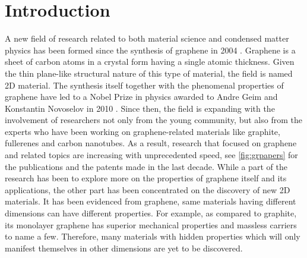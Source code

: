 
\chapter{Introduction \label{chap:1}}  %

\ifpdf
    \graphicspath{{Chapter1/Figs/Raster/}{Chapter1/Figs/PDF/}{Chapter1/Figs/}{Chapter1/Figs/Vector/}}
\else
    \graphicspath{{Chapter1/Figs/Vector/}{Chapter1/Figs/}}
\fi

A new field of research related to both material science and condensed matter physics has been formed since the synthesis of graphene in 2004 \cite{Novoselov666,Novoselov26072005}. Graphene is a sheet of carbon atoms in a crystal form having a single atomic thickness. Given the thin plane-like structural nature of this type of material, the field is named 2D material. The synthesis itself together with the phenomenal properties of graphene have led to a Nobel Prize in physics awarded to Andre Geim and Konstantin Novoselov in 2010 \cite{Geim2007}. Since then, the field is expanding with the involvement of researchers not only from the young community, but also from the experts who have been working on graphene-related materials like graphite, fullerenes and carbon nanotubes. As a result, research that focused on graphene and related topics are increasing with unprecedented speed, see \autoref{fig:grpapers} for the publications and the patents made in the last decade. While a part of the research has been to explore more on the properties of graphene itself and its applications, the other part has been concentrated on the discovery of new 2D materials. It has been evidenced from graphene, same materials having different dimensions can have different properties. For example, as compared to graphite, its monolayer graphene has superior mechanical properties and massless carriers to name a few. Therefore, many materials with hidden properties which will only manifest themselves in other dimensions are yet to be discovered. 


